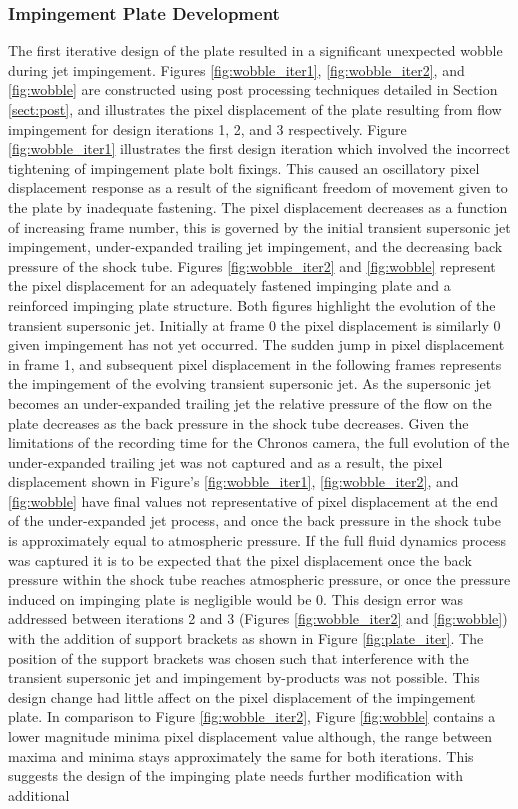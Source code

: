 \subsubsection{Impingement Plate Development}
The first iterative design of the plate resulted in a significant unexpected wobble during jet impingement. Figures \ref{fig:wobble_iter1}, \ref{fig:wobble_iter2}, and \ref{fig:wobble} are constructed using post processing techniques detailed in Section \ref{sect:post}, and illustrates the pixel displacement of the plate resulting from flow impingement for design iterations 1, 2, and 3 respectively. Figure \ref{fig:wobble_iter1} illustrates the first design iteration which involved the incorrect tightening of impingement plate bolt fixings. This caused an oscillatory pixel displacement response as a result of the significant freedom of movement given to the plate by inadequate fastening. The pixel displacement decreases as a function of increasing frame number, this is governed by the initial transient supersonic jet impingement, under-expanded trailing jet impingement, and the decreasing back pressure of the shock tube. Figures \ref{fig:wobble_iter2} and \ref{fig:wobble} represent the pixel displacement for an adequately fastened impinging plate and a reinforced impinging plate structure. Both figures highlight the evolution of the transient supersonic jet. Initially at frame 0 the pixel displacement is similarly 0 given impingement has not yet occurred. The sudden jump in pixel displacement in frame 1, and subsequent pixel displacement in the following frames represents the impingement of the evolving transient supersonic jet. As the supersonic jet becomes an under-expanded trailing jet the relative pressure of the flow on the plate decreases as the back pressure in the shock tube decreases. Given the limitations of the recording time for the Chronos camera, the full evolution of the under-expanded trailing jet was not captured and as a result, the pixel displacement shown in Figure's \ref{fig:wobble_iter1}, \ref{fig:wobble_iter2}, and \ref{fig:wobble} have final values not representative of pixel displacement at the end of the under-expanded jet process, and once the back pressure in the shock tube is approximately equal to atmospheric pressure. If the full fluid dynamics process was captured it is to be expected that the pixel displacement once the back pressure within the shock tube reaches atmospheric pressure, or once the pressure induced on impinging plate is negligible would be 0. This design error was addressed between iterations 2 and 3 (Figures \ref{fig:wobble_iter2} and \ref{fig:wobble}) with the addition of support brackets as shown in Figure \ref{fig:plate_iter}. The position of the support brackets was chosen such that interference with the transient supersonic jet and impingement by-products was not possible. This design change had little affect on the pixel displacement of the impingement plate. In comparison to Figure \ref{fig:wobble_iter2}, Figure \ref{fig:wobble} contains a lower magnitude minima pixel displacement value although, the range between maxima and minima stays approximately the same for both iterations. This suggests the design of the impinging plate needs further modification with additional 